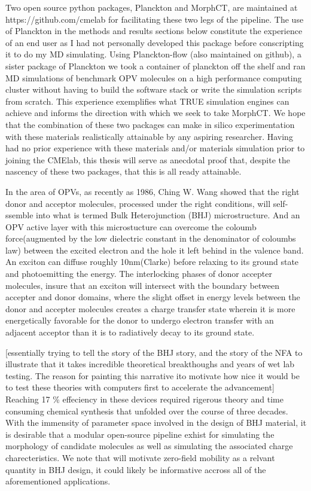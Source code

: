 Two open source python packages, Planckton and MorphCT, are maintained at https://github.com/cmelab for
facilitating these two legs of the pipeline. The use of Planckton in the methods and results sections below
constitute the experience of an end user as I had not personally developed this package before conscripting it
to do my MD simulating. Using Planckton-flow (also maintained on github), a sister package
of Planckton we took a container of planckton off the shelf and ran MD simulations of benchmark OPV
molecules on a high performance computing cluster without having to build the software stack or write the
simulation scripts from scratch. This experience exemplifies what TRUE simulation engines can achieve and
informs the direction with which we seek to take MorphCT. We hope that the combination of these two packages
can make in silico experimentation with these materials realistically attainable by any aspiring researcher.
Having had no prior experience with these materials and/or materials simulation prior to joining the CMElab,
this thesis will serve as anecdotal proof that, despite the nascency of these two packages, that this is all
ready attainable. 

In the area of OPVs, as recently as 1986, Ching W. Wang
showed that the right donor and acceptor molecules, processed under the right conditions, will self-ssemble
into what is termed Bulk Heterojunction (BHJ) microstructure. And an OPV active layer with this microstucture
can overcome the
coloumb force(augmented by the low dielectric constant in the denominator of coloumbs law) between the excited
electron and the hole it left behind in the valence band. An exciton can diffuse roughly 10nm(Clarke) before relaxing
to its ground state and photoemitting the energy. The interlocking phases of donor accepter molecules, insure
that an exciton will intersect with the boundary between accepter and donor domains, where the slight offset in
energy levels between the donor and accepter molecules creates a charge transfer state wherein it is more
energetically favorable for the donor to undergo electron transfer with an adjacent acceptor than it is to radiatively decay to its ground state.

[essentially trying to tell the story of the BHJ story, and the story of the NFA to illustrate that it takes
incredible theoretical breakthoughs and years of wet lab testing. The reason for painting this narrative ito
motivate how nice it would be to test these theories with computers first to accelerate the
advancement]
Reaching 17 \% effeciency in these devices required rigerous theory and time consuming chemical synthesis
that unfolded over the course of three decades. 
With the immensity of parameter space involved in the design of BHJ material, it is desirable that a modular
open-source pipeline exhist for simulating the morphology of candidate molecules as well as simulating the 
associated charge charecteristics. We note that will motivate zero-field mobility as a relvant quantity in BHJ
design, it could likely be informative accross all of the aforementioned applications. 


